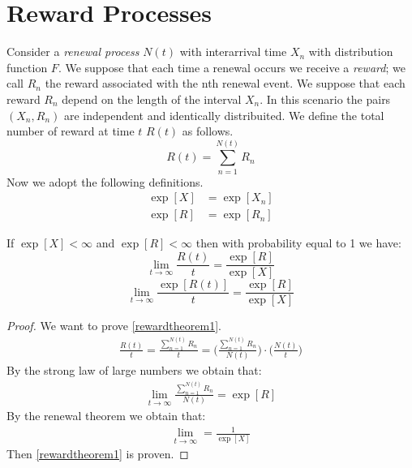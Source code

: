 \section{Reward Processes}

Consider a \textit{renewal process} $N(t)$ with interarrival time $X_n$ with distribution function $F$. We suppose that each time a renewal occurs we receive a \textit{reward}; we call $R_n$ the reward associated with the nth renewal event. We suppose that each reward $R_n$ depend on the length of the interval $X_n$. In this scenario the pairs $(X_n, R_n)$ are independent and identically distribuited. We define the total number of reward at time $t$ $R(t)$ as follows.
\begin{equation}
	R(t)=\sum_{n=1}^{N(t)}R_n
\end{equation}
Now we adopt the following definitions.
\begin{align*}
	\exp[X] & =\exp[X_n]
	\\ \exp[R] & =\exp[R_n]
\end{align*}
\begin{theorem}[Th. 3.6 (Ross)]
  If $\exp[X]<\infty$ and $\exp[R]<\infty$ then with probability equal to 1 we have:
	\begin{equation}
		\lim_{t \to \infty}\frac{R(t)}{t}=\frac{\exp[R]}{\exp[X]}
		\label{rewardtheorem1}
	\end{equation}
	\begin{equation}
		\lim_{t \to \infty}\frac{\exp[R(t)]}{t}=\frac{\exp[R]}{\exp[X]}
		\label{rewardtheorem2}
	\end{equation}
\end{theorem}
\begin{proof}
	We want to prove \ref{rewardtheorem1}.
	\begin{align*}
		\frac{R(t)}{t}=\frac{\sum_{n=1}^{N(t)}R_n}{t}= \bigg( \frac{\sum_{n=1}^{N(t)}R_n}{N(t)}\bigg)\cdot\bigg(\frac{N(t)}{t}\bigg)
	\end{align*}
	By the strong law of large numbers we obtain that:
	\begin{align*}
		\lim_{t \to \infty}\frac{\sum_{n=1}^{N(t)}R_n}{N(t)}=\exp[R]
	\end{align*}
	By the renewal theorem we obtain that:
	\begin{align*}
		\lim_{t \to \infty}=\frac{1}{\exp[X]}
	\end{align*}
	Then \ref{rewardtheorem1} is proven.
\end{proof}
